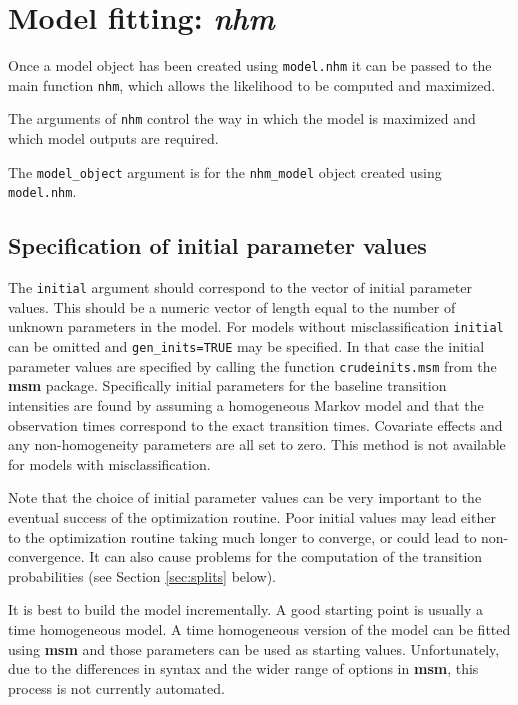 \documentclass{article}
\numberwithin{equation}{section}
\begin{document}
\section{Model fitting: {\it nhm}}

Once a model object has been created using \verb!model.nhm! it can be passed to the main function \verb!nhm!, which allows the likelihood to be computed and maximized.

The arguments of \verb!nhm! control the way in which the model is maximized and which model outputs are required.

The \verb!model_object! argument is for the \verb!nhm_model! object created using \verb!model.nhm!.

\subsection{Specification of initial parameter values}

The \verb!initial! argument should correspond to the vector of initial parameter values. This should be a numeric vector of length equal to the number of unknown parameters in the model. For models without misclassification \verb!initial! can be omitted and \verb!gen_inits=TRUE! may be specified. In that case the initial parameter values are specified by calling the function \verb!crudeinits.msm! from the {\bf msm} package. Specifically initial parameters for the baseline transition intensities are found by assuming a homogeneous Markov model and that the observation times correspond to the exact transition times. Covariate effects and any non-homogeneity parameters are all set to zero. This method is not available for models with misclassification.

Note that the choice of initial parameter values can be very important to the eventual success of the optimization routine. Poor initial values may lead either to the optimization routine taking much longer to converge, or could lead to non-convergence. It can also cause problems for the computation of the transition probabilities (see Section \ref{sec:splits} below).

It is best to build the model incrementally. A good starting point is usually a time homogeneous model. A time homogeneous version of the model can be fitted using {\bf msm} and those parameters can be used as starting values. Unfortunately, due to the differences in syntax and the wider range of options in {\bf msm}, this process is not currently automated.
\end{document}
